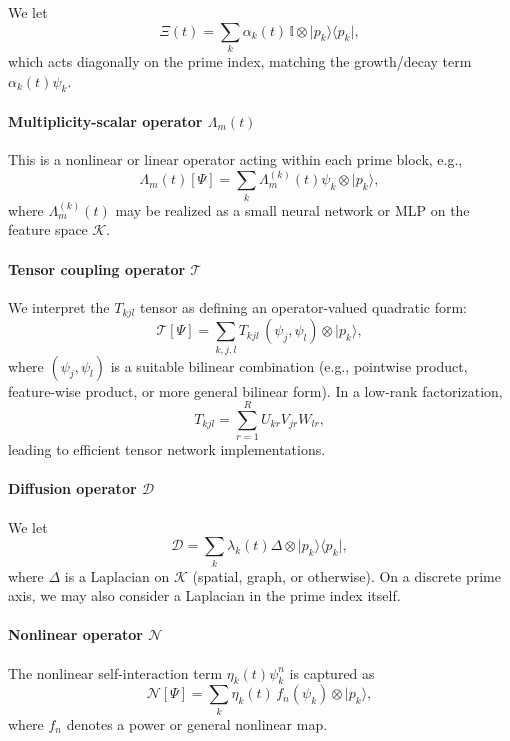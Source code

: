 \documentclass[11pt]{article}
\begin{document}
We let
\[
\Xi(t) = \sum_{k} \alpha_k(t)\, \mathbb{I} \otimes \lvert p_k\rangle\langle p_k\rvert,
\]
which acts diagonally on the prime index, matching the growth/decay term $\alpha_k(t)\psi_k$.

\paragraph{Multiplicity-scalar operator $\Lambda_m(t)$}

This is a nonlinear or linear operator acting within each prime block, e.g.,
\[
\Lambda_m(t)[\Psi] = \sum_k \Lambda^{(k)}_m(t)\psi_k \otimes \lvert p_k\rangle,
\]
where $\Lambda_m^{(k)}(t)$ may be realized as a small neural network or MLP on the feature space $\mathcal{K}$.

\paragraph{Tensor coupling operator $\mathcal{T}$}

We interpret the $T_{kjl}$ tensor as defining an operator-valued quadratic form:
\begin{equation}
\mathcal{T}[\Psi] = \sum_{k,j,l} T_{kjl}\,(\psi_j,\psi_l)\otimes \lvert p_k\rangle,
\end{equation}
where $(\psi_j,\psi_l)$ is a suitable bilinear combination (e.g., pointwise product, feature-wise product, or more general bilinear form). In a low-rank factorization,
\[
T_{kjl} = \sum_{r=1}^R U_{kr}V_{jr}W_{lr},
\]
leading to efficient tensor network implementations.

\paragraph{Diffusion operator $\mathcal{D}$}

We let
\[
\mathcal{D} = \sum_k \lambda_k(t) \Delta \otimes \lvert p_k\rangle\langle p_k\rvert,
\]
where $\Delta$ is a Laplacian on $\mathcal{K}$ (spatial, graph, or otherwise). On a discrete prime axis, we may also consider a Laplacian in the prime index itself.

\paragraph{Nonlinear operator $\mathcal{N}$}

The nonlinear self-interaction term $\eta_k(t)\psi_k^n$ is captured as
\[
\mathcal{N}[\Psi] = \sum_k \eta_k(t)\, f_n(\psi_k)\otimes \lvert p_k\rangle,
\]
where $f_n$ denotes a power or general nonlinear map.
\end{document}
